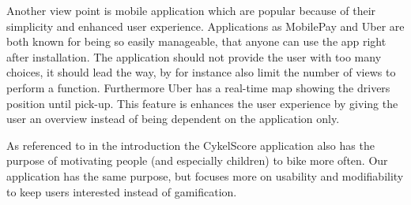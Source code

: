 Another view point is mobile application which are popular because of their simplicity and enhanced user experience. Applications as MobilePay and Uber are both known for being so easily manageable, that anyone can use the app right after installation. The application should not provide the user with too many choices, it should lead the way, by for instance also limit the number of views to perform a function. 
Furthermore Uber has a real-time map showing the drivers position until pick-up. This feature is enhances the user experience by giving the user an overview instead of being dependent on the application only. 

As referenced to in the introduction the CykelScore application also has the purpose of motivating people (and especially children) to bike more often. Our application has the same purpose, but focuses more on usability and modifiability to keep users interested instead of gamification.

